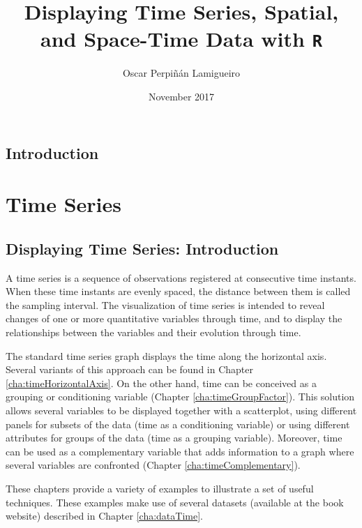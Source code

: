 \documentclass[smallroyalvopaper]{memoir}
\author{Oscar Perpiñán Lamigueiro}
\date{November 2017}
\title{Displaying Time Series, Spatial, and Space-Time Data with \texttt{R}}
\begin{document}
\maketitle
\frontmatter

\cleardoublepage

\setcounter{tocdepth}{1}
\tableofcontents

\mainmatter

\chapter{Introduction}
\label{sec:org5086718}
\label{sec:introduction}



\part{Time Series}
\label{sec:org82c7598}

\chapter{Displaying Time Series: Introduction}
\label{sec:org8885ffe}
\label{cha:timeIntro}

A time series is a sequence of observations registered at consecutive time instants. When these time instants are evenly spaced, the distance between them is called the sampling interval. The visualization of time series is intended to reveal changes of one or more quantitative variables through time, and to display the relationships between the variables and their evolution through time.

The standard time series graph displays the time along the horizontal axis. Several variants of this approach can be found in Chapter \ref{cha:timeHorizontalAxis}. On the other hand, time can be conceived as a grouping or conditioning variable (Chapter \ref{cha:timeGroupFactor}). This solution allows several variables to be displayed together with a scatterplot, using different panels for subsets of the data (time as a conditioning variable) or using different attributes for groups of the data (time as a grouping variable). Moreover, time can be used as a complementary variable that adds information to a graph where several variables are confronted (Chapter \ref{cha:timeComplementary}).

These chapters provide a variety of examples to illustrate a set of useful techniques. These examples make use of several datasets (available at the book website) described in Chapter \ref{cha:dataTime}.
\end{document}
